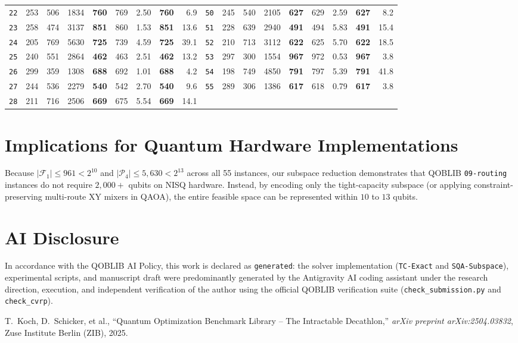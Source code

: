 \documentclass[10pt,a4paper]{article}
\begin{document}
\begin{table}[p!]
{\begin{tabular}{@{}crrrrrrrr@{\hspace{18pt}}crrrrrrrr@{}}
    \texttt{22} & 253 & 506 & 1834 & \textbf{760} & 769 & 2.50 & \textbf{760} & 6.9 & \texttt{50} & 245 & 540 & 2105 & \textbf{627} & 629 & 2.59 & \textbf{627} & 8.2 \\
    \texttt{23} & 258 & 474 & 3137 & \textbf{851} & 860 & 1.53 & \textbf{851} & 13.6 & \texttt{51} & 228 & 639 & 2940 & \textbf{491} & 494 & 5.83 & \textbf{491} & 15.4 \\
    \texttt{24} & 205 & 769 & 5630 & \textbf{725} & 739 & 4.59 & \textbf{725} & 39.1 & \texttt{52} & 210 & 713 & 3112 & \textbf{622} & 625 & 5.70 & \textbf{622} & 18.5 \\
    \texttt{25} & 240 & 551 & 2864 & \textbf{462} & 463 & 2.51 & \textbf{462} & 13.2 & \texttt{53} & 297 & 300 & 1554 & \textbf{967} & 972 & 0.53 & \textbf{967} & 3.8 \\
    \texttt{26} & 299 & 359 & 1308 & \textbf{688} & 692 & 1.01 & \textbf{688} & 4.2 & \texttt{54} & 198 & 749 & 4850 & \textbf{791} & 797 & 5.39 & \textbf{791} & 41.8 \\
    \texttt{27} & 244 & 536 & 2279 & \textbf{540} & 542 & 2.70 & \textbf{540} & 9.6 & \texttt{55} & 289 & 306 & 1386 & \textbf{617} & 618 & 0.79 & \textbf{617} & 3.8 \\
    \texttt{28} & 211 & 716 & 2506 & \textbf{669} & 675 & 5.54 & \textbf{669} & 14.1 &  & & & & & & & &  \\
\bottomrule
\end{tabular}%
}
\end{table}

\section{Implications for Quantum Hardware Implementations}

Because $|\mathcal{F}_1| \le 961 < 2^{10}$ and $|\mathcal{P}_4| \le 5,630 < 2^{13}$ across all 55 instances, our subspace reduction demonstrates that QOBLIB \texttt{09-routing} instances do not require $2,000+$ qubits on NISQ hardware. Instead, by encoding only the tight-capacity subspace (or applying constraint-preserving multi-route XY mixers in QAOA), the entire feasible space can be represented within $10$ to $13$ qubits.

\section*{AI Disclosure}
In accordance with the QOBLIB AI Policy, this work is declared as \texttt{generated}: the solver implementation (\texttt{TC-Exact} and \texttt{SQA-Subspace}), experimental scripts, and manuscript draft were predominantly generated by the Antigravity AI coding assistant under the research direction, execution, and independent verification of the author using the official QOBLIB verification suite (\texttt{check\_submission.py} and \texttt{check\_cvrp}).

\begin{thebibliography}{9}
T.~Koch, D.~Schicker, et al., ``Quantum Optimization Benchmark Library -- The Intractable Decathlon,'' \emph{arXiv preprint arXiv:2504.03832}, Zuse Institute Berlin (ZIB), 2025.
\end{thebibliography}
\end{document}
